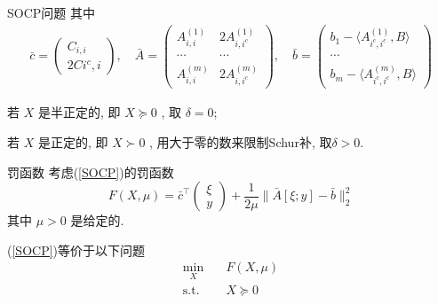 \documentclass[slidestop, compress, mathserif, UTF8]{beamer}
\numberwithin{equation}{section}                                        %
\begin{document}
			\begin{frame}[t]{SOCP问题}
				其中
				\begin{equation}
					\begin{split}\label{SOCPCondition}
							\bar{c}
						=	\begin{pmatrix} C_{i, i} \\ 2C{i^c, i} \end{pmatrix} , \quad
							\bar{A}
						=	\begin{pmatrix}
								A^{(1)}_{i, i} & 2A^{(1)}_{i, i^c} \\
								\cdots & \cdots \\
								A^{(m)}_{i, i} & 2A^{(m)}_{i, i^c}
							\end{pmatrix} , \quad
							\bar{b}
						=	\begin{pmatrix}
								b_1 - \langle{A^{(1)}_{i^c, i^c}, B}\rangle \\
								\cdots \\
								b_m - \langle{A^{(m)}_{i^c, i^c}, B}\rangle 
							\end{pmatrix}
					\end{split}
				\end{equation}
				
				若 $X$ 是半正定的, 即 $X \succeq 0$ , 取 $\delta = 0$; 
				
				若 $X$ 是正定的, 即 $X \succ 0$ , 用大于零的数来限制Schur补, 取$\delta > 0$.
			\end{frame}
			\begin{frame}[t]{罚函数}
				考虑(\ref{SOCP})的罚函数
				\begin{equation}\label{Powell}
						F(X, \mu)
					=	\bar{c}^\top \begin{pmatrix}\xi \\ y\end{pmatrix} + \frac{1}{2\mu} \lVert{\bar{A}[\xi; y] - \bar{b}}\rVert^2_2
				\end{equation}
				其中 $\mu > 0$ 是给定的.

				(\ref{SOCP})等价于以下问题
				\begin{equation}
					\begin{split}\label{PowellQ}
						\min_{X} \quad
							& F(X, \mu)\\
						\text{s.t.} \quad
							& X \succeq 0
					\end{split}
				\end{equation} 
			\end{frame}
\end{document}
